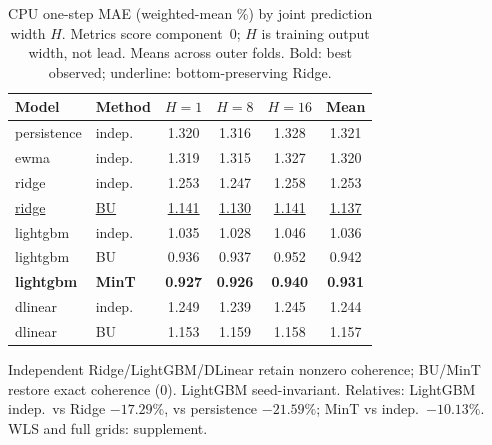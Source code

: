 \begin{table}[width=\columnwidth,pos=!t]
\centering
\caption{CPU one-step MAE (weighted-mean \%) by joint prediction width $H$.
Metrics score component~0; $H$ is training output width, not lead. Means across
outer folds. Bold: best observed; underline: bottom-preserving Ridge.}
\label{tab:cpu_main}
\begin{threeparttable}
\scriptsize
\setlength{\tabcolsep}{1.8pt}
\begin{tabular*}{\tblwidth}{@{\extracolsep{\fill}}llcccc@{}}
\toprule
Model & Method & $H{=}1$ & $H{=}8$ & $H{=}16$ & Mean \\
\midrule
persistence & indep. & 1.320 & 1.316 & 1.328 & 1.321 \\
ewma & indep. & 1.319 & 1.315 & 1.327 & 1.320 \\
ridge & indep. & 1.253 & 1.247 & 1.258 & 1.253 \\
\underline{ridge} & \underline{BU} & \underline{1.141} & \underline{1.130} & \underline{1.141} & \underline{1.137} \\
lightgbm & indep. & 1.035 & 1.028 & 1.046 & 1.036 \\
lightgbm & BU & 0.936 & 0.937 & 0.952 & 0.942 \\
\textbf{lightgbm} & \textbf{MinT} & \textbf{0.927} & \textbf{0.926} & \textbf{0.940} & \textbf{0.931} \\
dlinear & indep. & 1.249 & 1.239 & 1.245 & 1.244 \\
dlinear & BU & 1.153 & 1.159 & 1.158 & 1.157 \\
\bottomrule
\end{tabular*}
\begin{tablenotes}
\footnotesize
\item Independent Ridge/LightGBM/DLinear retain nonzero coherence; BU/MinT
restore exact coherence ($0$). LightGBM seed-invariant.
Relatives: LightGBM indep.\ vs Ridge $-17.29\%$, vs persistence $-21.59\%$;
MinT vs indep.\ $-10.13\%$. {WLS} and full grids: supplement.
\end{tablenotes}
\end{threeparttable}
\end{table}
